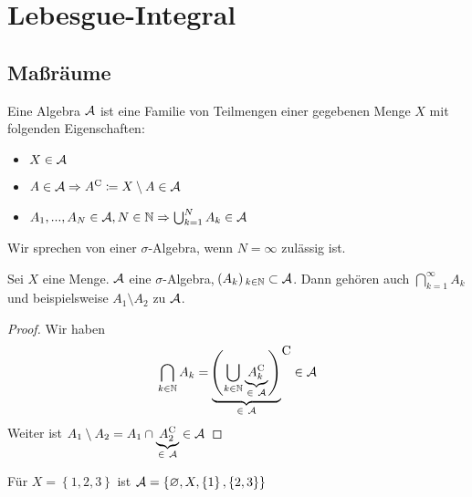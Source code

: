\documentclass[skript.tex]{subfiles}
\begin{document}
	\chapter{Lebesgue-Integral}
	\section{Maßräume}
	
	\begin{defin}[Algebra]
		Eine Algebra $\mathcal{A}$ ist eine Familie von Teilmengen einer gegebenen Menge $X$ mit folgenden Eigenschaften:
		\begin{itemize}
			\item $X \in \mathcal{A}$
			\item $A \in \mathcal{A} \Rightarrow A^\mathrm{C}\coloneqq X\setminus A \in \mathcal{A}$
			\item $A_1,...,A_N \in \mathcal{A}, N \in \mathbb{N} \Rightarrow \bigcup_{k=1}^N A_k \in \mathcal{A}$
		\end{itemize}
	Wir sprechen von einer $\sigma$-Algebra, wenn $N=\infty$ zulässig ist.
	\end{defin}

	\begin{lem}
		Sei $X$ eine Menge. $\mathcal{A}$ eine $\sigma$-Algebra, $\pr{A_k}_{k\in\mathbb{N}} \subset \mc{A}$. Dann gehören auch $\bigcap_{k=1}^\infty A_k$ und beispielsweise $A_1 \setminus A_2$ zu $\mathcal{A}$. 
	\end{lem}
	\begin{proof}
		Wir haben
			\begin{equation*}
				\bigcap_{k\in\mathbb{N}} A_k = \underbrace{\pr{\bigcup_{k\in\mathbb{N}} \underbrace{\cp{A_k}}_{\in\ \mc{A} } }}_{\in\ \mc{A}}  \raisebox{1.7em}{\kern -0.1em C}  \in \mc{A}
			\end{equation*}
		Weiter ist $A_1\setminus A_2 = A_1 \cap \underbrace{A_2^\mathrm{C}}_{\in\ \mathcal{A}} \in \mathcal{A}$
	\end{proof}
	
	\begin{bsp*}
		Für $X=\left\{ 1,2,3\right\}$ ist $\mathcal{A}=\left\{\varnothing, X, \left\{1\right\}, \left\{ 2,3\right\} \right\}$
	\end{bsp*}
	
\end{document}
